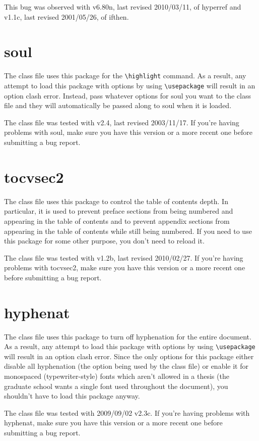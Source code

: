 This bug was observed with v6.80n, last revised 2010/03/11, of hyperref and v1.1c, last revised 2001/05/26, of ifthen.

\section{soul}
The class file uses this package for the \verb=\highlight= command.  As a result, any attempt to load this package with options by using \verb=\usepackage= will result in an option clash error.  Instead, pass whatever options for soul you want to the class file and they will automatically be passed along to soul when it is loaded.

The class file was tested with v2.4, last revised 2003/11/17.  If you're having problems with soul, make sure you have this version or a more recent one before submitting a bug report.

\section{tocvsec2}
The class file uses this package to control the table of contents depth.  In particular, it is used to prevent preface sections from being numbered and appearing in the table of contents and to prevent appendix sections from appearing in the table of contents while still being numbered.  If you need to use this package for some other purpose, you don't need to reload it.

The class file was tested with v1.2b, last revised 2010/02/27.  If you're having problems with tocvsec2, make sure you have this version or a more recent one before submitting a bug report.

\section{hyphenat}
The class file uses this package to turn off hyphenation for the entire document.  As a result, any attempt to load this package with options by using \verb=\usepackage= will result in an option clash error.  Since the only options for this package either disable all hyphenation (the option being used by the class file) or enable it for monospaced (typewriter-style) fonts which aren't allowed in a thesis (the graduate school wants a single font used throughout the document), you shouldn't have to load this package anyway.

The class file was tested with 2009/09/02 v2.3c.  If you're having problems with hyphenat, make sure you have this version or a more recent one before submitting a bug report.
\endinput
